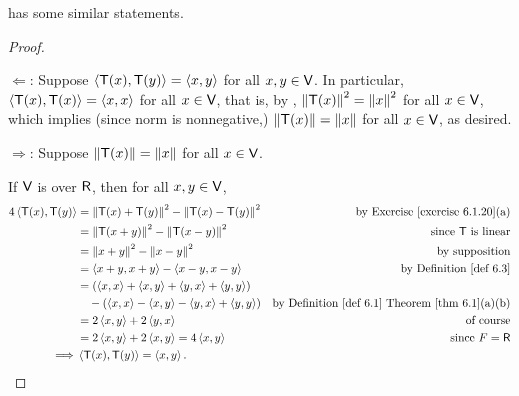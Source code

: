 \begin{note}
 has some similar statements.
\end{note}

\begin{proof} \ 

\(\Longleftarrow\): Suppose \(\left< \textsf{T}(x), \textsf{T}(y) \right> = \left< x, y \right>\) for all \(x, y \in \textsf{V}\).
In particular, \(\left< \textsf{T}(x), \textsf{T}(x) \right> = \left< x, x \right>\) for all \(x \in \textsf{V}\), that is, by , \(\left\lVert\textsf{T}(x)\right\rVert^2 = \left\lVert x\right\rVert^2\) for all \(x \in \textsf{V}\), which implies (since norm is nonnegative,) \(\left\lVert\textsf{T}(x)\right\rVert = \left\lVert x\right\rVert\) for all \(x \in \textsf{V}\), as desired.

\(\Longrightarrow\): Suppose \(\left\lVert\textsf{T}(x)\right\rVert = \left\lVert x\right\rVert\) for all \(x \in \textsf{V}\).

If \(\textsf{V}\) is over \(\textsf{R}\), then for all \(x, y \in \textsf{V}\),
\begin{align*}
    4 \LG \T(x), \T(y) \RG & = \norm{\T(x) + \T(y)}^2 - \norm{\T(x) - \T(y)}^2 & \text{by \EXEC{6.1.20}(a)} \\
        & = \norm{\T(x + y)}^2 - \norm{\T(x - y)}^2 & \text{since \(\T\) is linear} \\
        & = \norm{x + y}^2 - \norm{x - y}^2 & \text{by supposition} \\
        & = \LG x + y, x + y \RG - \LG x - y, x - y \RG & \text{by \DEF{6.3}} \\
        & = (\LG x, x \RG + \LG x, y \RG + \LG y, x \RG + \LG y, y \RG) \\
        & \quad - (\LG x, x \RG - \LG x, y \RG - \LG y, x \RG + \LG y, y \RG) & \text{by \DEF{6.1} \THM{6.1}(a)(b)} \\
        & = 2 \LG x, y \RG + 2 \LG y, x \RG & \text{of course} \\
        & = 2 \LG x, y \RG + 2 \LG x, y \RG = 4 \LG x, y \RG & \text{since \(F = \SET{R}\)} \\
    \implies & \LG \T(x), \T(y) \RG = \LG x, y \RG.
\end{align*}


\end{proof}
